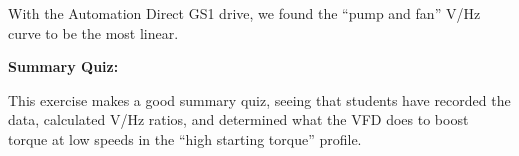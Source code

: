 











With the Automation Direct GS1 drive, we found the ``pump and fan'' V/Hz curve to be the most linear.

\vfil \eject

\noindent
{\bf Summary Quiz:}

This exercise makes a good summary quiz, seeing that students have recorded the data, calculated V/Hz ratios, and determined what the VFD does to boost torque at low speeds in the ``high starting torque'' profile.




